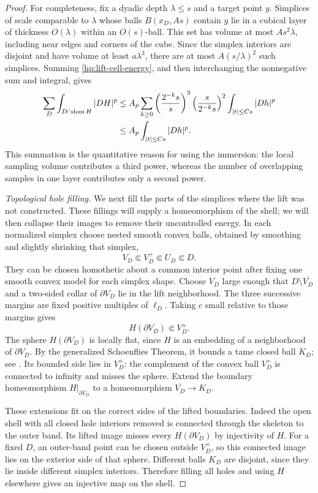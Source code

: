 \documentclass[11pt]{article}
\numberwithin{equation}{section}
\theoremstyle{definition}
\theoremstyle{remark}
\begin{document}
\begin{proof}
For completeness, fix a dyadic depth $\lambda\leq s$ and a target
point $y$.  Simplices of scale comparable to $\lambda$ whose balls
$B(x_D,As)$ contain $y$ lie in a cubical layer of thickness
$O(\lambda)$ within an $O(s)$-ball.  This set has volume at most
$As^2\lambda$, including near edges and corners of the cube.  Since
the simplex interiors are disjoint and have volume at least
$a\lambda^3$, there are at most $A(s/\lambda)^2$ such simplices.
Summing \eqref{hp:lift-cell-energy}, and then interchanging the
nonnegative sum and integral, gives
\begin{align}
 \sum_D\int_{D\cap\operatorname{dom}H}|DH|^p
 &\leq A_p\sum_{k\geq0}
        \left(\frac{2^{-k}s}{s}\right)^3
        \left(\frac{s}{2^{-k}s}\right)^2
        \int_{|t|\leq Cs}|Dh|^p\notag\\
 &\leq A_p\int_{|t|\leq Cs}|Dh|^p.
 \label{hp:lift-total-energy}
\end{align}
This summation is the quantitative reason for using the immersion:
the local sampling volume contributes a third power, whereas the
number of overlapping samples in one layer contributes only a second
power.

\emph{Topological hole filling.}
We next fill the parts of the simplices where the lift was not
constructed.  These fillings will supply a homeomorphism of the shell;
we will then collapse their images to remove their uncontrolled energy.  In each normalized simplex choose nested smooth convex
balls, obtained by smoothing and slightly shrinking that simplex,
\[
 V_D\Subset V_D^+\Subset U_D\Subset D.
\]
They can be chosen homothetic about a common interior point after
fixing one smooth convex model for each simplex shape.  Choose $V_D$
large enough that $D\setminus\overline{V_D}$ and a two-sided collar
of $\partial V_D$ lie in the lift neighborhood.  The three successive
margins are fixed positive multiples of $\ell_D$.  Taking $c$ small
relative to those margins gives
\[
 H(\partial V_D)\Subset V_D^+.
\]
The sphere $H(\partial V_D)$ is locally flat, since $H$ is an embedding
of a neighborhood of $\partial V_D$.  By the generalized Schoenflies
Theorem, it bounds a tame closed ball $K_D$; see
\cite[Theorem~5]{Brown1960}.  Its bounded side lies in $V_D^+$:
the complement of the convex ball $V_D^+$ is connected to infinity
and misses the sphere.  Extend the boundary homeomorphism
$H|_{\partial V_D}$ to a homeomorphism
$\overline{V_D}\to K_D$.

These extensions fit on the correct sides of the lifted boundaries.
Indeed the open shell with all closed hole interiors removed is
connected through the skeleton to the outer band.  Its lifted image
misses every $H(\partial V_D)$ by injectivity of $H$.  For a fixed
$D$, an outer-band point can be chosen outside $V_D^+$, so this
connected image lies on the exterior side of that sphere.  Different
balls $K_D$ are disjoint, since they lie inside different simplex
interiors.  Therefore filling all holes and using $H$ elsewhere gives
an injective map on the shell.


\end{proof}
\end{document}
